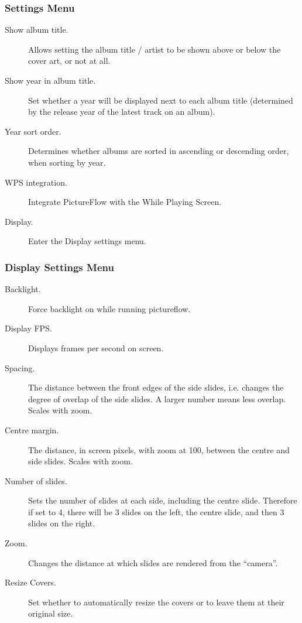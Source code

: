 \subsubsection{Settings Menu}

\begin{description}
  \item[Show album title.] Allows setting the album title / artist to be
  shown above or below the cover art, or not at all.
  \item[Show year in album title.] Set whether a year will be displayed next to each album
  title (determined by the release year of the latest track on an album).
  \item[Year sort order.] Determines whether albums are sorted in ascending or descending
  order, when sorting by year.
  \item[WPS integration.] Integrate PictureFlow with the While Playing Screen.
  \item[Display.] Enter the Display settings menu.
\end{description}

\subsubsection{Display Settings Menu}

\begin{description}
  \item[Backlight.] Force backlight on while running pictureflow.
  \item[Display FPS.] Displays frames per second on screen.
  \item[Spacing.] The distance between the front edges of the side slides, i.e. changes
  the degree of overlap of the side slides. A larger number means less overlap. Scales with zoom.
  \item[Centre margin.] The distance, in screen pixels, with zoom at 100, between
  the centre and side slides. Scales with zoom.
  \item[Number of slides.] Sets the number of slides at each side, including the
  centre slide. Therefore if set to 4, there will be 3 slides on the left,
  the centre slide, and then 3 slides on the right.
  \item[Zoom.] Changes the distance at which slides are rendered from the ``camera''.
  \item[Resize Covers.] Set whether to automatically resize the covers or to leave
  them at their original size.
\end{description}
